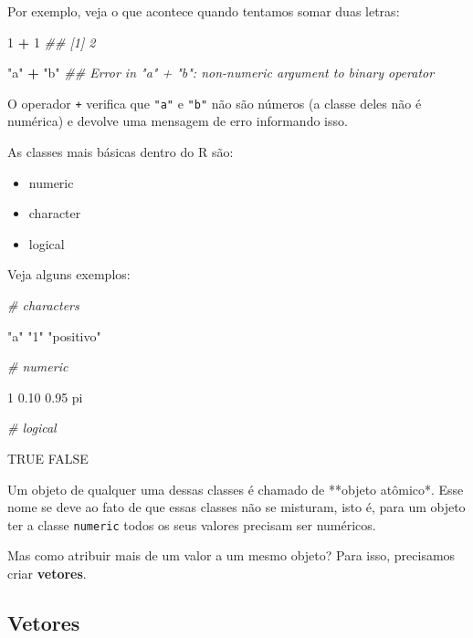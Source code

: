 \documentclass[
]{book}
\newenvironment{Shaded}{\begin{snugshade}}{\end{snugshade}}
\newcommand{\CommentTok}[1]{\textcolor[rgb]{0.56,0.35,0.01}{\textit{#1}}}
\newcommand{\DecValTok}[1]{\textcolor[rgb]{0.00,0.00,0.81}{#1}}
\newcommand{\FloatTok}[1]{\textcolor[rgb]{0.00,0.00,0.81}{#1}}
\newcommand{\NormalTok}[1]{#1}
\newcommand{\OperatorTok}[1]{\textcolor[rgb]{0.81,0.36,0.00}{\textbf{#1}}}
\newcommand{\OtherTok}[1]{\textcolor[rgb]{0.56,0.35,0.01}{#1}}
\newcommand{\StringTok}[1]{\textcolor[rgb]{0.31,0.60,0.02}{#1}}
\providecommand{\tightlist}{%
  \setlength{\itemsep}{0pt}\setlength{\parskip}{0pt}}
\begin{document}
Por exemplo, veja o que acontece quando tentamos somar duas letras:

\begin{Shaded}
\begin{Highlighting}[]
\DecValTok{1} \OperatorTok{+}\StringTok{ }\DecValTok{1}
\CommentTok{## [1] 2}

\StringTok{"a"} \OperatorTok{+}\StringTok{ "b"}
\CommentTok{## Error in "a" + "b": non-numeric argument to binary operator}
\end{Highlighting}
\end{Shaded}

O operador \texttt{+} verifica que \texttt{"a"} e \texttt{"b"} não são números (a classe deles não é numérica) e devolve uma mensagem de erro informando isso.

As classes mais básicas dentro do R são:

\begin{itemize}
\tightlist
\item
  numeric
\item
  character
\item
  logical
\end{itemize}

Veja alguns exemplos:

\begin{Shaded}
\begin{Highlighting}[]
\CommentTok{# characters}

\StringTok{"a"}
\StringTok{"1"}
\StringTok{"positivo"}

\CommentTok{# numeric}

\DecValTok{1}
\FloatTok{0.10}
\FloatTok{0.95}
\NormalTok{pi}

\CommentTok{# logical}

\OtherTok{TRUE}
\OtherTok{FALSE}
\end{Highlighting}
\end{Shaded}

Um objeto de qualquer uma dessas classes é chamado de **objeto atômico*. Esse nome se deve ao fato de que essas classes não se misturam, isto é, para um objeto ter a classe \texttt{numeric} todos os seus valores precisam ser numéricos.

Mas como atribuir mais de um valor a um mesmo objeto? Para isso, precisamos criar \textbf{vetores}.

\hypertarget{vetores}{%
\subsection{Vetores}\label{vetores}}
\end{document}
